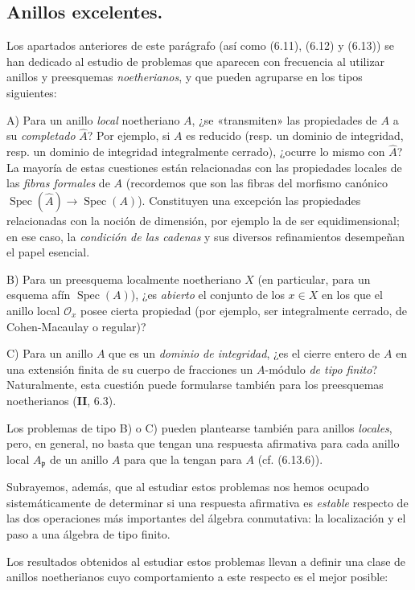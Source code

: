 \subsection{Anillos excelentes.}
\label{IV.2.ss7.8-fr}

\begin{env}[7.8.1]
\label{IV.2.s7.8.1-fr}
Los apartados anteriores de este parágrafo (así como (6.11), (6.12) y (6.13))
se han dedicado al estudio de problemas que aparecen con frecuencia al
utilizar anillos y preesquemas \emph{noetherianos}, y que pueden agruparse en los
tipos siguientes:

A) Para un anillo \emph{local} noetheriano $A$, ¿se «transmiten» las propiedades
de $A$ a su \emph{completado} $\widehat A$? Por ejemplo, si $A$ es reducido
(resp. un dominio de integridad, resp. un dominio de integridad integralmente
cerrado), ¿ocurre lo mismo con $\widehat A$? La mayoría de estas cuestiones
están relacionadas con las propiedades locales de las \emph{fibras formales}
de $A$ (recordemos que son las fibras del morfismo canónico
$\operatorname{Spec}(\widehat A)\to\operatorname{Spec}(A)$). Constituyen una
excepción las propiedades relacionadas con la noción de dimensión, por ejemplo
la de ser equidimensional; en ese caso, la \emph{condición de las cadenas} y
sus diversos refinamientos desempeñan el papel esencial.

B) Para un preesquema localmente noetheriano $X$ (en particular, para un esquema
afín $\operatorname{Spec}(A)$), ¿es \emph{abierto} el conjunto de los $x\in X$
en los que el anillo local $\mathcal O_x$ posee cierta propiedad (por ejemplo,
ser integralmente cerrado, de Cohen-Macaulay o regular)?

C) Para un anillo $A$ que es un \emph{dominio de integridad}, ¿es el cierre
entero de $A$ en una extensión finita de su cuerpo de fracciones un $A$-módulo
\emph{de tipo finito}? Naturalmente, esta cuestión puede formularse también
para los preesquemas noetherianos (\textbf{II}, 6.3).

Los problemas de tipo B) o C) pueden plantearse también para anillos
\emph{locales}, pero, en general, no basta que tengan una respuesta afirmativa
para cada anillo local $A_{\mathfrak p}$ de un anillo $A$ para que la tengan
para $A$ (cf. (6.13.6)).

Subrayemos, además, que al estudiar estos problemas nos hemos ocupado
sistemáticamente de determinar si una respuesta afirmativa es \emph{estable}
respecto de las dos operaciones más importantes del álgebra conmutativa:
la localización y el paso a una álgebra de tipo finito.

Los resultados obtenidos al estudiar estos problemas llevan a definir una
clase de anillos noetherianos cuyo comportamiento a este respecto es el mejor
posible:
\end{env}
